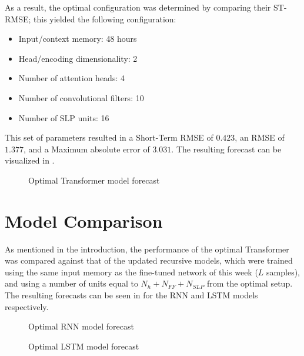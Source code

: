 \documentclass{scrartcl}
\begin{document}
    As a result, the optimal configuration was determined by comparing their ST-RMSE; this yielded the following configuration: 
    \begin{itemize}
      \item Input/context memory: 48 hours
      \item Head/encoding dimensionality: 2
      \item Number of attention heads: 4
      \item Number of convolutional filters: 10
      \item Number of SLP units: 16
    \end{itemize}
    This set of parameters resulted in a Short-Term RMSE of $0.423$, an RMSE of $1.377$, and a Maximum absolute error of $3.031$. The resulting forecast can be visualized in .

    \begin{figure}[ht]
      \centering
      
      \caption{Optimal Transformer model forecast}
      \label{fig:transformer_forecast}
    \end{figure}

  \section{Model Comparison}

    As mentioned in the introduction, the performance of the optimal Transformer was compared against that of the updated recursive models, which were trained using the same input memory as the fine-tuned network of this week ($L$ samples), and using a number of units equal to $N_h + N_{FF} + N_{SLP}$ from the optimal setup. The resulting forecasts can be seen in  for the RNN and LSTM models respectively.

    \begin{figure}[ht]
      \centering
      
      \caption{Optimal RNN model forecast}
      \label{fig:rnn_forecast}
    \end{figure}

    \begin{figure}[ht]
      \centering
      
      \caption{Optimal LSTM model forecast}
      \label{fig:lstm_forecast}
    \end{figure}
\end{document}
